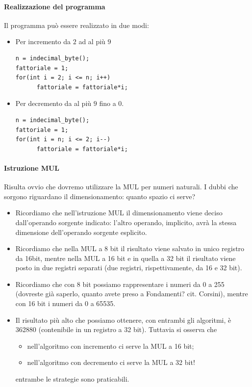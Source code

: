 \documentclass[11pt]{report}
\begin{document}
\paragraph{Realizzazione del programma} Il programma può essere realizzato in due modi:
\begin{itemize}
\item Per incremento da $2$ ad al più $9$
\begin{verbatim}
n = indecimal_byte();
fattoriale = 1;
for(int i = 2; i <= n; i++)
      fattoriale = fattoriale*i;
\end{verbatim}
\item Per decremento da al più $9$ fino a $0$.
\begin{verbatim}
n = indecimal_byte();
fattoriale = 1;
for(int i = n; i <= 2; i--)
      fattoriale = fattoriale*i;
\end{verbatim}
\end{itemize}
\paragraph{Istruzione MUL} Risulta ovvio che dovremo utilizzare la MUL per numeri naturali. I dubbi che sorgono riguardano il dimensionamento: quanto spazio ci serve?
\begin{itemize}
\item Ricordiamo che nell'istruzione MUL il dimensionamento viene deciso dall'operando sorgente indicato: l'altro operando, implicito, avrà la stessa dimensione dell'operando sorgente esplicito. 
\item Ricordiamo che nella MUL a 8 bit il risultato viene salvato in unico registro da 16bit, mentre nella MUL a 16 bit e in quella a 32 bit il risultato viene posto in due registri separati (due registri, rispettivamente, da 16 e 32 bit).
\item Ricordiamo che con 8 bit possiamo rappresentare i numeri da 0 a 255 (dovreste già saperlo, quanto avete preso a Fondamenti? cit. Corsini), mentre con 16 bit i numeri da 0 a 65535.
\item Il risultato più alto che possiamo ottenere, con entrambi gli algoritmi, è 362880 (contenibile in un registro a 32 bit). Tuttavia si osserva che
\begin{itemize}
\item nell'algoritmo con incremento ci serve la MUL a 16 bit;
\item nell'algoritmo con decremento ci serve la MUL a 32 bit!
\end{itemize}
entrambe le strategie sono praticabili. 
\end{itemize}
\end{document}
